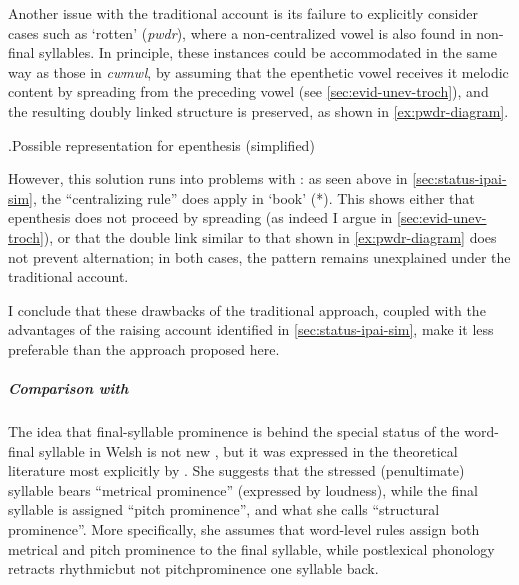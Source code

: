 Another issue with the traditional account is its failure to explicitly consider cases such as \ipa{[ˈpuːdur]} `rotten' (\emph{pwdr}), where a non-centralized vowel is also found in non-final syllables. In principle, these instances could be accommodated in the same way as those in \emph{cwmwl}, by assuming that the epenthetic vowel receives it melodic content by spreading from the preceding vowel (see \cref{sec:evid-unev-troch}), and the resulting doubly linked structure is preserved, as shown in \ref{ex:pwdr-diagram}.

\ex.\label{ex:pwdr-diagram}Possible representation for epenthesis (simplified)\\

However, this solution runs into problems with \ipa{[i]}: as seen above in \cref{sec:status-ipai-sim}, the \enquote{centralizing rule} does apply in \ipa{[ˈɬəvir]} `book' (*\ipa{[ˈɬiːvir]}). This shows either that epenthesis does not proceed by spreading (as indeed I argue in \cref{sec:evid-unev-troch}), or that the double link similar to that shown in \ref{ex:pwdr-diagram} does not prevent alternation; in both cases, the pattern remains unexplained under the traditional account.

I conclude that these drawbacks of the traditional approach, coupled with the advantages of the raising account identified in \cref{sec:status-ipai-sim}, make it less preferable than the approach proposed here.

\subparagraph{Comparison with \citet{bosch96:_promin}}
\label{sec:comp-with-bosch}

The idea that final\hyp syllable prominence is behind the special status of the word\hyp final syllable in Welsh is not new \citep{watkins76:_cyfnew_gymraeg}, but it was expressed in the theoretical literature most explicitly by \citet{bosch96:_promin}. She suggests that the stressed (penultimate) syllable bears \enquote{metrical prominence} (expressed by loudness), while the final syllable is assigned \enquote{pitch prominence}, and what she calls \enquote{structural prominence}. More specifically, she assumes that word-level rules assign both metrical and pitch prominence to the final syllable, while postlexical phonology retracts rhythmic\dash but not pitch\dash prominence one syllable back.

